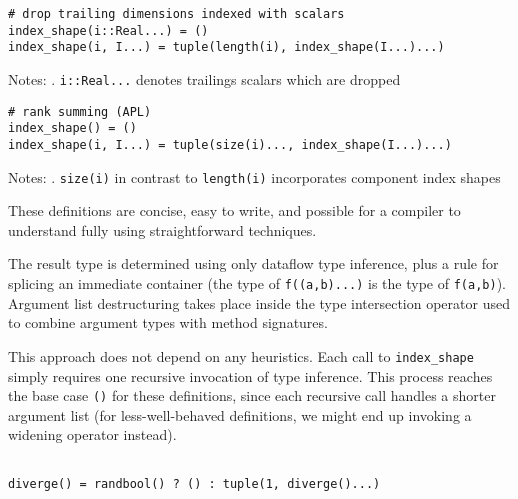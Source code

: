 \documentclass[preprint]{sigplanconf}
\begin{document}

{\small
\begin{verbatim}
# drop trailing dimensions indexed with scalars
index_shape(i::Real...) = ()
index_shape(i, I...) = tuple(length(i), index_shape(I...)...)
\end{verbatim}
}

\noindent Notes: . \verb+i::Real...+ denotes trailings scalars  which are dropped \newline


{\small
\begin{verbatim}
# rank summing (APL)
index_shape() = ()
index_shape(i, I...) = tuple(size(i)..., index_shape(I...)...)
\end{verbatim}
}


\noindent Notes: . \verb+size(i)+ in contrast to \verb+length(i)+ incorporates component index shapes \newline

These definitions are concise, easy to write, and possible for a compiler to
understand fully using straightforward techniques.


The result type is determined using only dataflow type inference, plus a rule
for splicing an immediate container (the type of \texttt{f((a,b)...)} is the
type of \texttt{f(a,b)}). Argument list destructuring takes place inside the
type intersection operator used to combine argument types with method
signatures.

This approach does not depend on any heuristics. Each call to
\texttt{index\_shape} simply requires one recursive invocation of type
inference. This process reaches the base case \texttt{()} for these
definitions, since each recursive call handles a shorter argument list (for
less-well-behaved definitions, we might end up invoking a widening operator
instead).

\begin{verbatim}

diverge() = randbool() ? () : tuple(1, diverge()...)

\end{verbatim}
\end{document}

